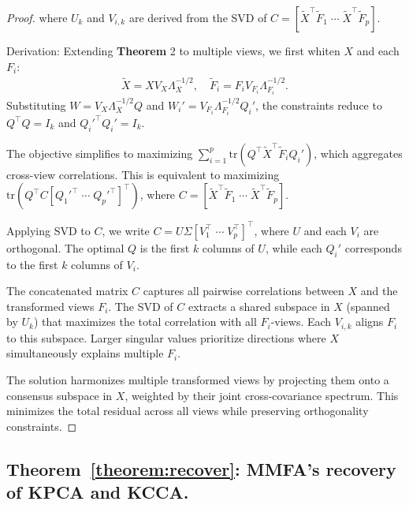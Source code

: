 \documentclass{article}
\begin{document}
\begin{proof}


where \( U_k \) and \( V_{i,k} \) are derived from the SVD of \( C = [\tilde{X}^\top \tilde{F}_1 \; \cdots \; \tilde{X}^\top \tilde{F}_p] \).

Derivation:  
Extending \textbf{Theorem} 2 to multiple views, we first whiten \( X \) and each \( F_i \):  
\begin{equation}
\begin{aligned}
\tilde{X} = X V_X\Lambda_X^{-1/2}, \quad \tilde{F}_i = F_i V_{F_i}\Lambda_{F_i}^{-1/2}.
\end{aligned}
\end{equation} 
Substituting \( W = V_X\Lambda_X^{-1/2} Q \) and \( W_i' = V_{F_i}\Lambda_{F_i}^{-1/2} Q_i' \), the constraints reduce to \( Q^\top Q = I_k \) and \( Q_i'^\top Q_i' = I_k \).  

The objective simplifies to maximizing \( \sum_{i=1}^p \text{tr}(Q^\top \tilde{X}^\top \tilde{F}_i Q_i') \), which aggregates cross-view correlations. This is equivalent to maximizing \( \text{tr}(Q^\top C [Q_1'^\top \; \cdots \; Q_p'^\top]^\top) \), where \( C = [\tilde{X}^\top \tilde{F}_1 \; \cdots \; \tilde{X}^\top \tilde{F}_p] \).  

Applying SVD to \( C \), we write \( C = U \Sigma [V_1^\top \; \cdots \; V_p^\top]^\top \), where \( U \) and each \( V_i \) are orthogonal. The optimal \( Q \) is the first \( k \) columns of \( U \), while each \( Q_i' \) corresponds to the first \( k \) columns of \( V_i \).  


The concatenated matrix \( C \) captures all pairwise correlations between \( X \) and the transformed views \( F_i \). The SVD of \( C \) extracts a shared subspace in \( X \) (spanned by \( U_k \)) that maximizes the total correlation with all \( F_i \)-views. Each \( V_{i,k} \) aligns \( F_i \) to this subspace. Larger singular values prioritize directions where \( X \) simultaneously explains multiple \( F_i \).  

The solution harmonizes multiple transformed views by projecting them onto a consensus subspace in \( X \), weighted by their joint cross-covariance spectrum. This minimizes the total residual across all views while preserving orthogonality constraints.  


\end{proof}

\subsection{Theorem~\ref{theorem:recover}: MMFA's recovery of KPCA and KCCA.}\label{sec:recoverk}
\end{document}
